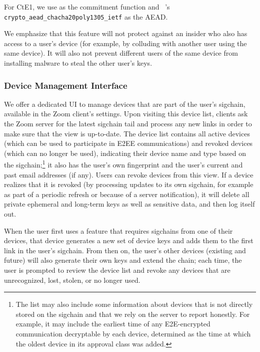 For \textsf{CtE1}, we use \HMACSHATWO as the commitment function and
\sodium{}~\cite{libsodium}'s \linebreak \texttt{crypto\_aead\_chacha20poly1305\_ietf} as the AEAD.

We emphasize that this feature will not protect against an insider who also has access to a user's
device (for example, by colluding with another user using the same device). It will also not prevent
different users of the same device from installing malware to steal the other user's keys.

\subsubsection{Device Management Interface}
\label{subsubsec:devicemgmt}

We offer a dedicated UI to manage devices that are part of the user's sigchain, available in the
Zoom client's settings. Upon visiting this device list, clients ask the Zoom server for the latest
sigchain tail and process any new links in order to make sure that the view is up-to-date. The
device list contains all active devices (which can be used to participate in E2EE communications)
and revoked devices (which can no longer be used), indicating their device name and type based on
the sigchain;\footnote{The list may also include some information about devices that is not directly
stored on the sigchain and that we rely on the server to report honestly. For example, it may
include the earliest time of any E2E-encrypted communication decryptable by each device, determined
as the time at which the oldest device in its approval class was added.} it also has the user's own
fingerprint and the user's current and past email addresses (if any). Users can revoke devices from
this view. If a device realizes that it is revoked (by processing updates to its own sigchain, for
example as part of a periodic refresh or because of a server notification), it will delete all
private ephemeral and long-term keys as well as sensitive data, and then log itself out.

When the user first uses a feature that requires sigchains from one of their devices, that device
generates a new set of device keys and adds them to the first link in the user's sigchain. From then
on, the user's other devices (existing and future) will also generate their own keys and extend the
chain; each time, the user is prompted to review the device list and revoke any devices that are
unrecognized, lost, stolen, or no longer used.

